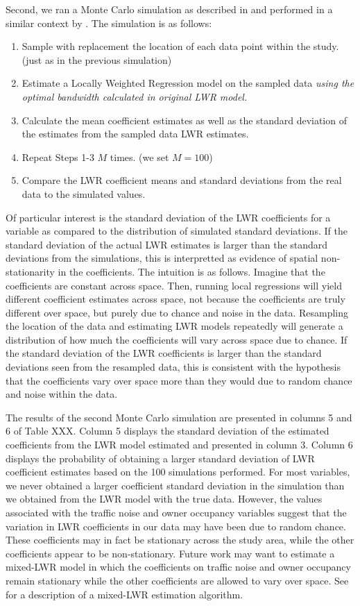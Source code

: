 \documentclass{article}\usepackage{graphicx, color}
\begin{document}
Second, we ran a Monte Carlo simulation as described in \citet{Fotheringham2002} and performed in a similar context by \citet{MarmolejoDuarteCarlos;GonzalezTamez2009}. The simulation is as follows:
\begin{enumerate}
\item Sample with replacement the location of each data point within the study. (just as in the previous simulation)
\item Estimate a Locally Weighted Regression model on the sampled data \emph{using the optimal bandwidth calculated in original LWR model.}
\item Calculate the mean coefficient estimates as well as the standard deviation of the estimates from the sampled data LWR estimates.
\item Repeat Steps 1-3 $M$ times. (we set $M = 100$)
\item Compare the LWR coefficient means and standard deviations from the real data to the simulated values.
\end{enumerate}
Of particular interest is the standard deviation of the LWR coefficients for a variable as compared to the distribution of simulated standard deviations. If the standard deviation of the actual LWR estimates is larger than the standard deviations from the simulations, this is interpretted as evidence of spatial non-stationarity in the coefficients. The intuition is as follows. Imagine that the coefficients are constant across space. Then, running local regressions will yield different coefficient estimates across space, not because the coefficients are truly different over space, but purely due to chance and noise in the data. Resampling the location of the data and estimating LWR models repeatedly will generate a distribution of how much the coefficients will vary across space due to chance. If the standard deviation of the LWR coefficients is larger than the standard deviations seen from the resampled data, this is consistent with the hypothesis that the coefficients vary over space more than they would due to random chance and noise within the data. 

The results of the second Monte Carlo simulation are presented in columns 5 and 6 of Table XXX. Column 5 displays the standard deviation of the estimated coefficients from the LWR model estimated and presented in column 3. Column 6 displays the probability of obtaining a larger standard deviation of LWR coefficient estimates based on the 100 simulations performed. For most variables, we never obtained a larger coefficient standard deviation in the simulation than we obtained from the LWR model with the true data. However, the values associated with the traffic noise and owner occupancy variables suggest that the variation in LWR coefficients in our data may have been due to random chance. These coefficients may in fact be stationary across the study area, while the other coefficients appear to be non-stationary. Future work may want to estimate a mixed-LWR model in which the coefficients on traffic noise and owner occupancy remain stationary while the other coefficients are allowed to vary over space. See \citet{Fotheringham2002} for a description of a mixed-LWR estimation algorithm.
\end{document}
